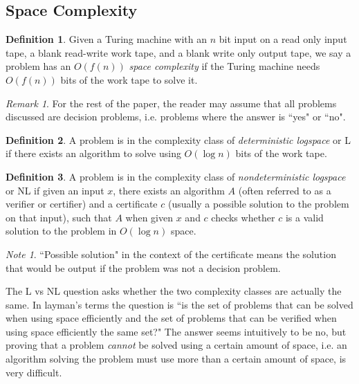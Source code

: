 \documentclass[a4paper,12pt]{article}
\theoremstyle{plain}
\theoremstyle{definition}
\newtheorem{defn}{Definition}
\theoremstyle{remark}
\newtheorem*{note}{Note}
\newtheorem{remark}{Remark}
\begin{document}
\subsection{Space Complexity}
\begin{defn}
  Given a Turing machine with an $n$ bit input on a read only input tape, a blank read-write work tape, and a blank write only output tape, we say a problem has an $O(f(n))$ \textit{space complexity} if the Turing machine needs $O(f(n))$ bits of the work tape to solve it.
\end{defn}
\begin{remark}
  For the rest of the paper, the reader may assume that all problems discussed are decision problems, i.e. problems where the answer is ``yes" or ``no".
\end{remark}
\begin{defn}
  A problem is in the complexity class of \textit{deterministic logspace} or L if there exists an algorithm to solve using $O(\log n)$ bits of the work tape.
\end{defn}
\begin{defn}
  A problem is in the complexity class of \textit{nondeterministic logspace} or NL if given an input $x$, there exists an algorithm $A$ (often referred to as a verifier or certifier) and a certificate $c$ (usually a possible solution to the problem on that input), such that $A$ when given $x$ and $c$ checks whether $c$ is a valid solution to the problem in $O(\log n)$ space.
\end{defn}
\begin{note}
  ``Possible solution" in the context of the certificate means the solution that would be output if the problem was not a decision problem.
\end{note}
The L vs NL question asks whether the two complexity classes are actually the same. In layman's terms the question is ``is the set of problems that can be solved when using space efficiently and the set of problems that can be verified when using space efficiently the same set?" The answer seems intuitively to be no, but proving that a problem \textit{cannot} be solved using a certain amount of space, i.e. an algorithm solving the problem must use more than a certain amount of space, is very difficult.
\end{document}

